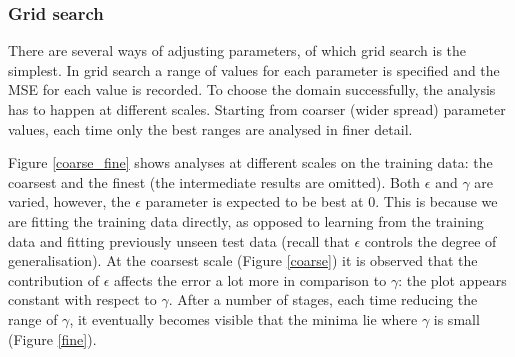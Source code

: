 \documentclass[12pt,a4paper,notitlepage,twoside]{scrbook}
\begin{document}
\subsubsection*{Grid search}

There are several ways of adjusting parameters, of which grid search is the simplest. In
grid search a range of values for each parameter is specified and the 
MSE for each value is recorded. To choose the domain successfully, the analysis has to
happen at different scales. Starting from coarser (wider spread) parameter values, each
time only the best ranges are analysed in finer detail.

Figure \ref{coarse_fine} shows analyses at different scales on the training data: the
coarsest and the finest (the intermediate results are omitted). Both $\epsilon$ and
$\gamma$ are varied, however, the $\epsilon$ parameter is expected to be best at 0. This is because we
are fitting the training data directly, as opposed to learning from the training data and
fitting previously unseen test data (recall that $\epsilon$ controls the degree of
generalisation). At the coarsest scale (Figure \ref{coarse}) it is
observed that the contribution of $\epsilon$ affects the error a lot more in
comparison to $\gamma$: the plot appears constant with respect to $\gamma$. After a number
of stages, each time reducing the range of $\gamma$, it eventually becomes visible that the
minima lie where $\gamma$ is small (Figure \ref{fine}). 
\end{document}

